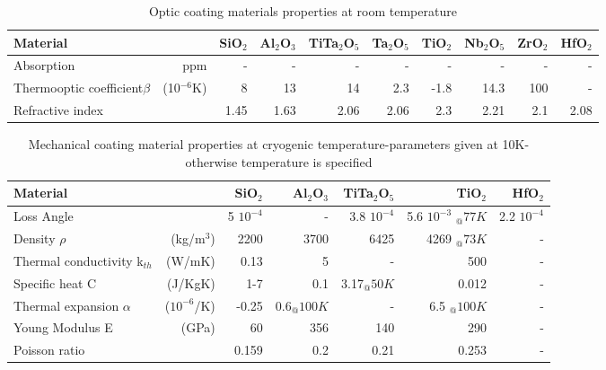 \begin{table}
\begin{center}
\begin{tabular}{|l r||r|r|r|r|r|r|r|r|}
  \hline
    {\large\strut} Material  & & SiO$_2$ & Al$_2$O$_3$ & TiTa$_2$O$_5$ & Ta$_2$O$_5$ & TiO$_2$ & Nb$_2$O$_5$ & ZrO$_2$ & HfO$_2$ \\
  \hline
  \hline
   {\large\strut} Absorption & ppm & - & - & - & - & - & - & - & - \\
   {\large\strut} \parbox{0.1\linewidth} {Thermooptic \\ coefficient$\beta$}  & (10$^{-6}$K) &  8 & 13 & 14 & 2.3& -1.8 & 14.3 & 100 & - \\
   {\large\strut} Refractive index & & 1.45 & 1.63 & 2.06 & 2.06 & 2.3 & 2.21 & 2.1 & 2.08 \\
  \hline
\end{tabular}
\end{center}
\caption{Optic coating materials properties at room temperature}
\label{tab:Optic_Coat_Param}
\end{table}

\begin{table}
\begin{center}
\begin{tabular}{|l r||r|r|r|r|r|}
  \hline
    {\large\strut} Material  & & SiO$_2$ & Al$_2$O$_3$ &  TiTa$_2$O$_5$ & TiO$_2$ & HfO$_2$ \\
  \hline
  \hline
   {\large\strut} Loss Angle & & 5 $10^{-4}$ & -  & 3.8 $10^{-4}$ & 5.6 $10^{-3}$ $_@77K$ & 2.2 $10^{-4}$  \\
   {\large\strut} Density $\rho$ & (kg/m$^3$) & 2200 & 3700 & 6425 & 4269 $_@73K$ & - \\
   {\large\strut} Thermal conductivity k$_{th}$ & (W/mK) & 0.13  & 5 & - & 500 & - \\
   {\large\strut} Specific heat C & (J/KgK) & 1-7  &  0.1 & 3.17$_@ 50K$ & 0.012 & - \\
   {\large\strut} Thermal expansion $\alpha$ & ($10^{-6}$/K) &  -0.25  & 0.6$_@100K$ & - & 6.5 $_@100K$ & - \\
   {\large\strut} Young Modulus E & (GPa) &  60 & 356 & 140 & 290 & - \\
   {\large\strut} Poisson ratio & & 0.159 & 0.2 & 0.21 & 0.253 & - \\
  \hline
\end{tabular}
\end{center}
\caption{Mechanical coating material properties at cryogenic temperature-parameters
given at 10K-otherwise temperature is specified}
\label{tab:Mech_Coat_Param_cryo}
\end{table}


